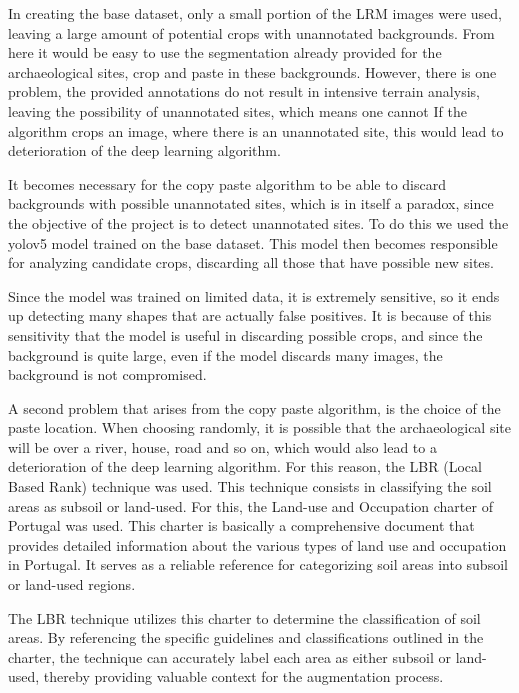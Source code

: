 In creating the base dataset, only a small portion of the LRM images were used, leaving a large amount of potential crops with unannotated backgrounds. From here it would be easy to use the segmentation already provided for the archaeological sites, crop and paste in these backgrounds. However, there is one problem, the provided annotations do not result in intensive terrain analysis, leaving the possibility of unannotated sites, which means one cannot If the algorithm crops an image, where there is an unannotated site, this would lead to deterioration of the deep learning algorithm.

It becomes necessary for the copy paste algorithm to be able to discard backgrounds with possible unannotated sites, which is in itself a paradox, since the objective of the project is to detect unannotated sites. To do this we used the yolov5 model trained on the base dataset. This model then becomes responsible for analyzing candidate crops, discarding all those that have possible new sites. 

Since the model was trained on limited data, it is extremely sensitive, so it ends up detecting many shapes that are actually false positives. It is because of this sensitivity that the model is useful in discarding possible crops, and since the background is quite large, even if the model discards many images, the background is not compromised.

A second problem that arises from the copy paste algorithm, is the choice of the paste location. When choosing randomly, it is possible that the archaeological site will be over a river, house, road and so on, which would also lead to a deterioration of the deep learning algorithm. For this reason, the LBR (Local Based Rank) technique was used. This technique consists in classifying the soil areas as subsoil or land-used. For this, the Land-use and Occupation charter of Portugal was used. This charter is basically a comprehensive document that provides detailed information about the various types of land use and occupation in Portugal. It serves as a reliable reference for categorizing soil areas into subsoil or land-used regions.

The LBR technique utilizes this charter to determine the classification of soil areas. By referencing the specific guidelines and classifications outlined in the charter, the technique can accurately label each area as either subsoil or land-used, thereby providing valuable context for the augmentation process.

